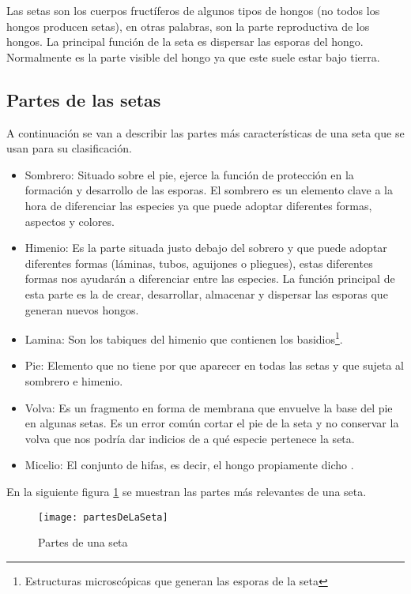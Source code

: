 Las setas son los cuerpos fructíferos de algunos tipos de hongos (no todos los hongos producen setas), en otras palabras, son la parte reproductiva de los hongos. La principal función de la seta es dispersar las esporas del hongo. Normalmente es la parte visible del hongo ya que este suele estar bajo tierra.

\subsection{Partes de las setas}

A continuación se van a describir las partes más características de una seta que se usan para su clasificación.

\begin{itemize}
	\item{Sombrero}: Situado sobre el pie, ejerce la función de protección en la formación y desarrollo de las esporas. El sombrero es un elemento clave a la hora de diferenciar las especies ya que puede adoptar diferentes formas, aspectos y colores.
	\item{Himenio}: Es la parte situada justo debajo del sobrero y que puede adoptar diferentes formas (láminas, tubos, aguijones o pliegues), estas diferentes formas nos ayudarán a diferenciar entre las especies. La función principal de esta parte es la de crear, desarrollar, almacenar y dispersar las esporas que generan nuevos hongos.
	\item{Lamina}: Son los tabiques del himenio que contienen los basidios\footnote{Estructuras microscópicas que generan las esporas de la seta}.
	\item{Pie}: Elemento que no tiene por que aparecer en todas las setas y que sujeta al sombrero e himenio.
	\item{Volva}: Es un fragmento en forma de membrana que envuelve la base del pie en algunas setas. Es un error común cortar el pie de la seta y no conservar la volva que nos podría dar indicios de a qué especie pertenece la seta.
	\item{Micelio}: El conjunto de hifas, es decir, el hongo propiamente dicho \cite{partesSeta}.
\end{itemize}


En la siguiente figura \ref{figpartesDeLaSeta} se muestran las partes más relevantes de una seta.

\begin{figure}[h]
    \begin{center}%
        \begin{center}%
          \texttt{[image: partesDeLaSeta]}%
          \caption{Partes de una seta \cite{imagenPartesSeta}}%
          \label{figpartesDeLaSeta}%
        \end{center}%
  	\end{center}%
\end{figure}%

